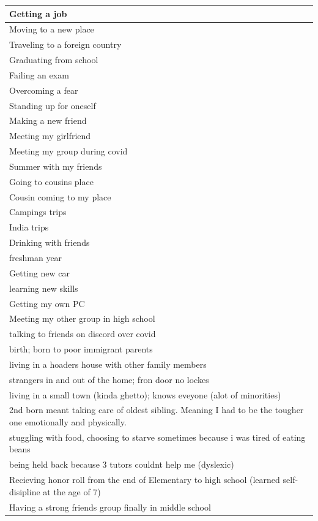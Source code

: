 \documentclass[
  .7em,
  letterpaper,
  DIV=11,
  numbers=noendperiod]{scrartcl}
\begin{document}
\begin{table}
\begin{tabular}{l}
\hline
Getting a job\\
\hline
Moving to a new place\\
\hline
Traveling to a foreign country\\
\hline
Graduating from school\\
\hline
Failing an exam\\
\hline
Overcoming a fear\\
\hline
Standing up for oneself\\
\hline
Making a new friend\\
\hline
Meeting my girlfriend\\
\hline
Meeting my group during covid\\
\hline
Summer with my friends\\
\hline
Going to cousins place\\
\hline
Cousin coming to my place\\
\hline
Campings trips\\
\hline
India trips\\
\hline
Drinking with friends\\
\hline
freshman year\\
\hline
Getting new car\\
\hline
learning new skills\\
\hline
Getting my own PC\\
\hline
Meeting my other group in high school\\
\hline
talking to friends on discord over covid\\
\hline
birth; born to poor immigrant parents\\
\hline
living in a hoaders house with other family members\\
\hline
strangers in and out of the home; fron door no lockes\\
\hline
living in a small town (kinda ghetto); knows eveyone (alot of minorities)\\
\hline
2nd born meant taking care of oldest sibling. Meaning I had to be the tougher one emotionally and physically.\\
\hline
stuggling with food, choosing to starve sometimes because i was tired of eating beans\\
\hline
being held back because 3 tutors couldnt help me (dyslexic)\\
\hline
Recieving honor roll from the end of Elementary to high school (learned self-disipline at the age of 7)\\
\hline
Having a strong friends group finally in middle school\\

\end{tabular}
\end{table}
\end{document}
